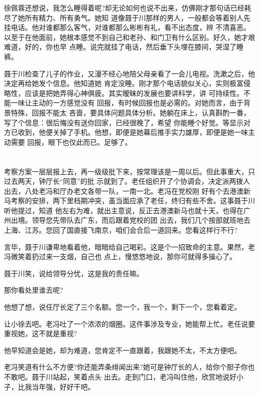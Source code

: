 \documentclass[11pt,a4paper,onecolumn]{article}
\begin{document}
徐佩蓉还想说，我怎么睡得着呢?却无论如何也说不出来，仿佛刚才那句话已经耗尽了她所有精力、所有勇气。她知
道像聂于川那样的男人，一般都会等着别人先挂电话。他对谁都那么客气，对谁都那么彬彬有礼，看不出态度，辨
不清喜恶。以至于在他面前，她根本感觉不到自己和老孙、和门卫有什么区别。好久，她才艰难道，好的，你也早
点睡。说完就挂了电话，然后垂下头埋在膝间，哭湿了睡裤。

聂于川检查了儿子的作业，又漫不经心地陪父母亲看了一会儿电视。洗漱之后，他决定再给她发个信息。他知道她
肯定没睡。刚才那个电话貌似关心，实则极富侵略性，应该是把她弄得心神俱疲。其实暧昧的发展也要讲科学，讲
可持续性。不能一味让主动的一方感觉没有 回报，有时候回报也是必需的。对她而言，由于背景特殊，回报不能太
吝啬，要具体问题具体分析。她躺在床上，认真斟酌一番，写了个信息：很后悔没有送你回家，已经很晚了，希望
你能睡个好觉。等显示对方已收到，他便关掉了手机。他想，即便是她幕后推手实力雄厚，即便是她一味主动需要
回报，眼下也仅此而已。足够了。

\section[\thesection]{}

考察方案一层层报上去，再一级级批下来，按常理该是一周以后。但此事重大，只过去两天，钟厅长“同意”的批
示就到了。老任组织开了个协调会，决定派两拨人出去，八处老冯和厅办老文各带一队，一南一北。老冯在党校刚
好有个去港澳新马考察的安排，两下里档期冲突，虽当面应承了老任，终归有些不舍。这事聂于川听他提过，知道
他左右为难，就出主意说，反正去港澳新马也就十天，也得在广州出境。领导您先带队去广东，而后跟着党校的团
出去，我们几个按部就班地去上海、江苏。您回了国直接飞南京，咱们会合后一道回来。您看这样行不行?

言毕，聂于川谦卑地看着他，暗暗给自己喝彩。这是个一招致命的主意。果然，老冯微笑着扔过来一支烟，自己也
点上，慢悠悠地说，那你可就得多操心了。

聂于川笑，说给领导分忧，这是我的责任嘛。

那你看处里谁去呢?

他想了想，说任厅长定了三个名额。您一个，我一个，剩下一个，您看着定。

让小徐去吧。老冯吐了一个浓浓的烟圈。这件事涉及专业，她能帮上忙。老任说要重视她，这不就是重视?

他早知道会是她，却为难道，您肯定不一直跟着，我跟她不太，不太方便吧。

老冯笑道有什么不方便?你还能弄条绯闻出来?她可是钟厅长的人，给你个胆子你也不敢吧。聂于川站起，笑着点头
出去。走到门口，老冯叫住他，欣赏地说好小子，比我当年强，好好干吧。
\end{document}
